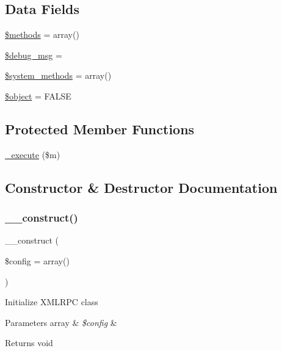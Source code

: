\subsection*{Data Fields}
\begin{DoxyCompactItemize}
\item 
\mbox{\hyperlink{class_c_i___xmlrpcs_a802753499268a04da139bd6e6ef89b35}{\$methods}} = array()
\item 
\mbox{\hyperlink{class_c_i___xmlrpcs_afed2f9c39f2e406bcdff222ce412bda8}{\$debug\+\_\+msg}} = \textquotesingle{}\textquotesingle{}
\item 
\mbox{\hyperlink{class_c_i___xmlrpcs_a07c837152d76c5e72b0bd7a065fa9c10}{\$system\+\_\+methods}} = array()
\item 
\mbox{\hyperlink{class_c_i___xmlrpcs_a52123b83a1952a68c5513e47d59ec4a6}{\$object}} = F\+A\+L\+SE
\end{DoxyCompactItemize}
\subsection*{Protected Member Functions}
\begin{DoxyCompactItemize}
\item 
\mbox{\hyperlink{class_c_i___xmlrpcs_a2f039adb8ec59c693300993c95138b46}{\+\_\+execute}} (\$m)
\end{DoxyCompactItemize}


\subsection{Constructor \& Destructor Documentation}
\mbox{\label{class_c_i___xmlrpcs_af7f9493844d2d66e924e3c1df51ce616}} 
\subsubsection{\texorpdfstring{\+\_\+\+\_\+construct()}{\_\_construct()}}
{\footnotesize\ttfamily \+\_\+\+\_\+construct (\begin{DoxyParamCaption}\item[{}]{\$config = {\ttfamily array()} }\end{DoxyParamCaption})}

Initialize X\+M\+L\+R\+PC class


\begin{DoxyParams}[1]{Parameters}
array & {\em \$config} & \\
\hline
\end{DoxyParams}
\begin{DoxyReturn}{Returns}
void 
\end{DoxyReturn}


